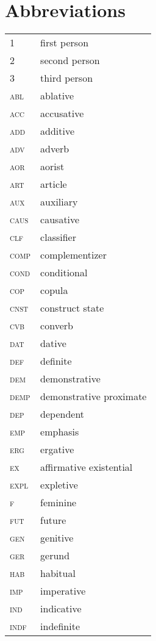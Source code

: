 \documentclass[output=paper]{langsci/langscibook}
\begin{document}
\section*{Abbreviations}
\begin{minipage}{\textwidth}
\begin{tabularx}{.5\textwidth}[t]{@{} l Q }
1				&first person\\
2 				&second person\\
3 				&third person\\
\textsc{abl}	&ablative\\
\textsc{acc}		&accusative\\
\textsc{add}		&additive\\
\textsc{adv}		&adverb\\
\textsc{aor}		&aorist\\
\textsc{art}		&article\\
\textsc{aux}		&auxiliary\\
\textsc{caus}		&causative\\
\textsc{clf}		&classifier\\
\textsc{comp}	&complementizer\\
\textsc{cond}		&conditional\\
\textsc{cop}		&copula\\
\textsc{cnst}		&construct state\\
\textsc{cvb}		&converb\\
\textsc{dat}		&dative\\
\textsc{def}		&definite\\
\textsc{dem}		&demonstrative\\
\textsc{demp}		&demonstrative proximate\\
\textsc{dep}		&dependent\\
\textsc{emp}		&emphasis\\
\textsc{erg}		&ergative\\
\textsc{ex}		&affirmative existential\\
\textsc{expl}		&expletive\\
\textsc{f} 		&feminine\\
\textsc{fut}		&future\\
\textsc{gen}		&genitive\\
\textsc{ger}		&gerund\\
\textsc{hab}		&habitual\\
\textsc{imp}		&imperative\\
\textsc{ind}		&indicative\\
\textsc{indf}		&indefinite\\

\end{tabularx}
\end{minipage}
\end{document}
